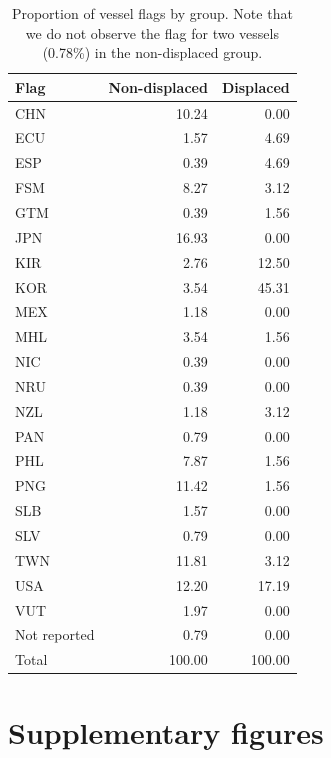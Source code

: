 \documentclass[12pt]{article}
\begin{document}
\begin{table}[t]
\caption{\label{tab:balance_table_flags}Proportion of vessel flags by group. Note that we do not observe the flag for two vessels (0.78\%) in the non-displaced group.}
\centering
\begin{tabular}{l|r|r}
\hline
Flag & Non-displaced & Displaced\\
\hline
CHN & 10.24 & 0.00\\
\hline
ECU & 1.57 & 4.69\\
\hline
ESP & 0.39 & 4.69\\
\hline
FSM & 8.27 & 3.12\\
\hline
GTM & 0.39 & 1.56\\
\hline
JPN & 16.93 & 0.00\\
\hline
KIR & 2.76 & 12.50\\
\hline
KOR & 3.54 & 45.31\\
\hline
MEX & 1.18 & 0.00\\
\hline
MHL & 3.54 & 1.56\\
\hline
NIC & 0.39 & 0.00\\
\hline
NRU & 0.39 & 0.00\\
\hline
NZL & 1.18 & 3.12\\
\hline
PAN & 0.79 & 0.00\\
\hline
PHL & 7.87 & 1.56\\
\hline
PNG & 11.42 & 1.56\\
\hline
SLB & 1.57 & 0.00\\
\hline
SLV & 0.79 & 0.00\\
\hline
TWN & 11.81 & 3.12\\
\hline
USA & 12.20 & 17.19\\
\hline
VUT & 1.97 & 0.00\\
\hline
Not reported & 0.79 & 0.00\\
\hline
Total & 100.00 & 100.00\\
\hline
\end{tabular}
\end{table}

\clearpage

\FloatBarrier

\section{Supplementary figures}
\end{document}
